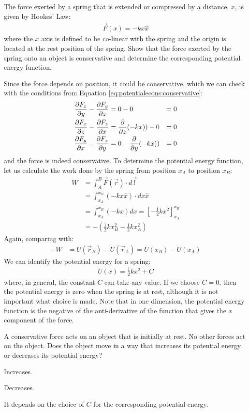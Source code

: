 \newpage
\begin{example}{\label{ex:potentialecons:springpotential}The force exerted by a spring that is extended or compressed by a distance, $x$, is given by Hookes' Law:
\begin{align*}
\vec F(x) = -k x\hat x
\end{align*}
where the $x$ axis is defined to be co-linear with the spring and the origin is located at the rest position of the spring. Show that the force exerted by the spring onto an object is conservative and determine the corresponding potential energy function.}

Since the force depends on position, it could be conservative, which we can check with the conditions from Equation \ref{eq:potentialecons:conservative}:
\begin{align*}
\frac{\partial F_z}{\partial y}-\frac{\partial F_y}{\partial z} &= 0 - 0 &= 0\\
\frac{\partial F_x}{\partial z}-\frac{\partial F_z}{\partial x} &= \frac{\partial }{\partial z}(-kx)) - 0&= 0\\
\frac{\partial F_y}{\partial x}-\frac{\partial F_x}{\partial y} &= 0 - \frac{\partial }{\partial y}(-kx)) &=0
\end{align*}
and the force is indeed conservative. To determine the potential energy function, let us calculate the work done by the spring from position $x_A$ to position $x_B$:
\begin{align*}
W &=\int_A^B \vec F(\vec r) \cdot d\vec l\\
&=\int_{x_A}^{x_B} (-kx\hat x) \cdot dx \hat x\\
&=\int_{x_A}^{x_B} (-kx)dx=\left[-\frac{1}{2}kx^2  \right]_{x_A}^{x_B}\\
&=-\left( \frac{1}{2}kx_B^2-\frac{1}{2}kx_A^2 \right)
\end{align*}
Again, comparing with:
\begin{align*}
-W &= U(\vec r_B) - U(\vec r_A) = U(x_B) - U(x_A)
\end{align*}
We can identify the potential energy for a spring:
\begin{align*}
U(x) = \frac{1}{2}kx^2 + C
\end{align*}
where, in general, the constant $C$ can take any value. If we choose $C=0$, then the potential energy is zero when the spring is at rest, although it is not important what choice is made. Note that in one dimension, the potential energy function is the negative of the anti-derivative of the function that gives the $x$ component of the force.
\end{example}

\begin{checkpoint}
\begin{MCquestion}{A conservative force acts on an object that is initially at rest. No other forces act on the object. Does the object move in a way that increases its potential energy or decreases its potential energy?}
\item Increases.
\item Decreases. \correct
\item It depends on the choice of $C$ for the corresponding potential energy.
\end{MCquestion}
\end{checkpoint}

